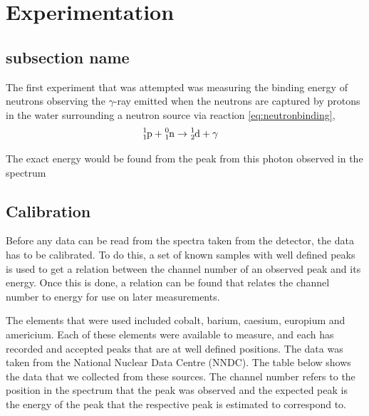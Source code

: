 
\section{Experimentation} %
\label{sec:experimentation}

\subsection{subsection name} %
\label{sub:subsection_name}
The first experiment that was attempted was measuring the binding energy of neutrons observing the $\gamma$-ray emitted when the neutrons are captured by protons in the water surrounding a neutron source via reaction \ref{eq:neutronbinding},
\begin{align}
	\cf{^{1}_{1}p} + \cf{^{0}_{1}n} &\rightarrow \cf{^{1}_{2}d} + \gamma \label{eq:neutronbinding}
\end{align}

The exact energy would be found from the peak from this photon observed in the spectrum

\subsection{Calibration} %
\label{sub:calibration}
Before any data can be read from the spectra taken from the detector, the data has to be calibrated. To do this, a set of known samples with well defined peaks is used to get a relation between the channel number of an observed peak and its energy. Once this is done, a relation can be found that relates the channel number to energy for use on later measurements.

The elements that were used included cobalt, barium, caesium, europium and americium. Each of these elements were available to measure, and each has recorded and accepted peaks that are at well defined positions. The data was taken from the National Nuclear Data Centre (NNDC). The table below shows the data that we collected from these sources. The channel number refers to the position in the spectrum that the peak was observed and the expected peak is the energy of the peak that the respective peak is estimated to correspond to.

